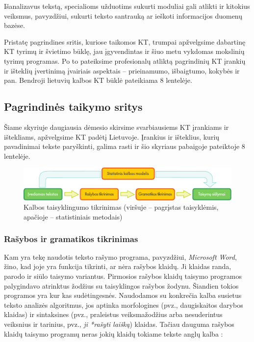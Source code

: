 \begin{multicols}{2}
Išanalizavus tekstą, specialioms užduotims sukurti moduliai gali atlikti ir kitokius veiksmus, pavyzdžiui, sukurti teksto santrauką ar ieškoti informacijos duomenų bazėse.
 
Pristatę pagrindines sritis, kuriose taikomos KT, trumpai apžvelgsime dabartinę KT tyrimų ir švietimo būklę, jau įgyvendintas ir šiuo metu vykdomas mokslinių tyrimų programas. Po to pateiksime profesionalų atliktą pagrindinių KT įrankių ir išteklių įvertinimą įvairiais aspektais – prieinamumo, išbaigtumo, kokybės ir pan. Bendroji lietuvių kalbos KT būklė pateikiama 8 lentelėje.

\subsection{Pagrindinės taikymo sritys} 

Šiame skyriuje daugiausia dėmesio skirsime svarbiausiems KT įrankiams ir ištekliams, apžvelgsime KT padėtį Lietuvoje. Įrankius ir išteklius, kurių pavadinimai tekste paryškinti, galima rasti ir šio skyriaus pabaigoje pateiktoje 8 lentelėje. 

\begin{figure}[htb]
  \center
  \includegraphics[width=\textwidth]{../_media/lithuanian/language_checking}
  \caption{Kalbos taisyklingumo tikrinimas (viršuje – pagrįstas taisyklėmis, apačioje – statistiniais metodais)} %
  \label{fig:langcheckingaarch_de}
\end{figure}

\subsubsection{Rašybos ir gramatikos tikrinimas}

Kam yra tekę naudotis teksto rašymo programa, pavyzdžiui, \textit{Microsoft Word}, žino, kad joje yra funkcija tikrinti, ar nėra rašybos klaidų. Ji klaidas randa, parodo ir siūlo taisymo variantus. Pirmosios rašybos klaidų taisymo programos palygindavo atrinktus žodžius su taisyklingos rašybos žodynu. Šiandien tokios programos yra kur kas sudėtingesnės. Naudodamos su konkrečia kalba susietus teksto analizės algoritmus, jos aptinka morfologines (pvz., daugiskaitos darybos klaidas) ir sintaksines (pvz., praleistus veiksmažodžius arba nesuderintus veiksnius ir tarinius, pvz., \textit{ji *rašyti laišką}) klaidas. Tačiau dauguma rašybos klaidų taisymo programų neras jokių klaidų tokiame tekste anglų kalba \cite{zar1}:


\end{multicols}
